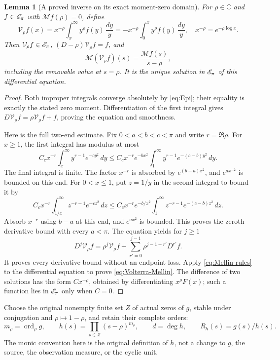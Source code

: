 \documentclass[11pt]{article}
\newcommand{\C}{\mathbb C}\newcommand{\R}{\mathbb R}
\newcommand{\Mell}{\mathcal M}\newcommand{\Sch}{\mathcal S}
\newcommand{\ord}{\operatorname{ord}}\newcommand{\tr}{\operatorname{tr}}
\newtheorem{lemma}[theorem]{Lemma}
\begin{document}
\begin{lemma}[A proved inverse on its exact moment-zero domain]
\label{lem:volterra}
For $\rho\in\C$ and $f\in\mathscr E_\pi$ with $\Mell f(\rho)=0$, define
\begin{equation}\label{eq:Volterra}
\mathcal V_\rho f(x)
=x^{-\rho}\int_x^\infty y^\rho f(y)\,\frac{dy}{y}
=-x^{-\rho}\int_0^x y^\rho f(y)\,\frac{dy}{y},
\quad x^{-\rho}=e^{-\rho\log x}.
\end{equation}
Then $\mathcal V_\rho f\in\mathscr E_\pi$,
$(D-\rho)\mathcal V_\rho f=f$, and
\begin{equation}\label{eq:Volterra-Mellin}
\Mell(\mathcal V_\rho f)(s)=\frac{\Mell f(s)}{s-\rho},
\end{equation}
including the removable value at $s=\rho$. It is the unique
solution in $\mathscr E_\pi$ of this differential equation.
\end{lemma}
\begin{proof}
Both improper integrals converge absolutely by \eqref{eq:Epi};
their equality is exactly the stated zero moment. Differentiation
of the first integral gives $D\mathcal V_\rho f=\rho\mathcal
V_\rho f+f$, proving the equation and smoothness.

Here is the full two-end estimate. Fix $0<a<b<c<\pi$ and
write $r=\Re\rho$. For $x\geq1$, the first integral has modulus
at most
\[
C_c x^{-r}\int_x^\infty y^{r-1}e^{-cy^2}\,dy
\leq C_c x^{-r}e^{-bx^2}
\int_1^\infty y^{r-1}e^{-(c-b)y^2}\,dy.
\]
The final integral is finite. The factor $x^{-r}$ is absorbed by
$e^{(b-a)x^2}$, and $e^{ax^{-2}}$ is bounded on this end.
For $0<x\leq1$, put $z=1/y$ in the second integral to bound it by
\[
C_c x^{-r}\int_{1/x}^\infty z^{-r-1}e^{-cz^2}\,dz
\leq C_c x^{-r}e^{-b/x^2}
\int_1^\infty z^{-r-1}e^{-(c-b)z^2}\,dz.
\]
Absorb $x^{-r}$ using $b-a$ at this end, and $e^{ax^2}$ is bounded.
This proves the zeroth derivative bound with every $a<\pi$.
The equation yields for $j\geq1$
\[
D^j\mathcal V_\rho f
=\rho^j\mathcal V_\rho f+
\sum_{r'=0}^{j-1}\rho^{j-1-r'}D^{r'}f.
\]
It proves every derivative bound without an endpoint loss.
Apply \eqref{eq:Mellin-rules} to the differential equation to prove
\eqref{eq:Volterra-Mellin}. The difference of two solutions has the
form $Cx^{-\rho}$, obtained by differentiating $x^\rho F(x)$;
such a function lies in $\mathscr E_\pi$ only when $C=0$.
\end{proof}

Choose the original nonempty finite set $Z$ of actual zeros of $g$,
stable under conjugation and $\rho\mapsto1-\rho$, and retain their
complete orders:
\begin{equation}\label{eq:h}
m_\rho=\ord_\rho g,\qquad
h(s)=\prod_{\rho\in Z}(s-\rho)^{m_\rho},\qquad d=\deg h,
\qquad R_h(s)=g(s)/h(s).
\end{equation}
The monic convention here is the original definition of $h$, not a
change to $g$, the source, the observation measure, or the cyclic unit.
\end{document}
